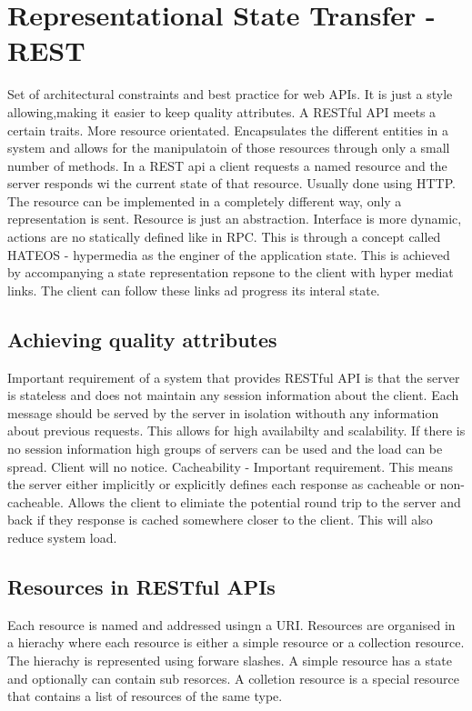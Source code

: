 \documentclass[a4paper, 11pt]{book}
\begin{document}
    \section{Representational State Transfer - REST}
    Set of architectural constraints and best practice for web APIs. It is just a style allowing,making it easier to keep quality attributes.
    A RESTful API meets a certain traits.
    More resource orientated. Encapsulates the different entities in a system and allows for the manipulatoin of those resources through only a small number of methods.
    In a REST api a client requests a named resource and the server responds wi the current state of that resource.
    Usually done using HTTP. The resource can be implemented in a completely different way, only a representation is sent.
    Resource is just an abstraction.
    Interface is more dynamic, actions are no statically defined like in RPC.
    This is through a concept called HATEOS - hypermedia as the enginer of the application state.
    This is achieved by accompanying a state representation repsone to the client with hyper mediat links.
    The client can follow these links ad progress its interal state.

    \subsection{Achieving quality attributes}
    Important requirement of a system that provides RESTful API is that the server is stateless and does not maintain any session information about the client.
    Each message should be served by the server in isolation withouth any information about previous requests.
    This allows for high availabilty and scalability.
    If there is no session information high groups of servers can be used and the load can be spread. Client will no notice.
    Cacheability - Important requirement. This means the server either implicitly or explicitly defines each response as cacheable or non-cacheable.
    Allows the client to elimiate the potential round trip to the server and back if they response is cached somewhere closer to the client.
    This will also reduce system load.

    \subsection{Resources in RESTful APIs}
    Each resource is named and addressed usingn a URI.
    Resources are organised in a hierachy where each resource is either a simple resource or a collection resource.
    The hierachy is represented using forware slashes.
    A simple resource has a state and optionally can contain sub resorces.
    A colletion resource is a special resource that contains a list of resources of the same type.
\end{document}
